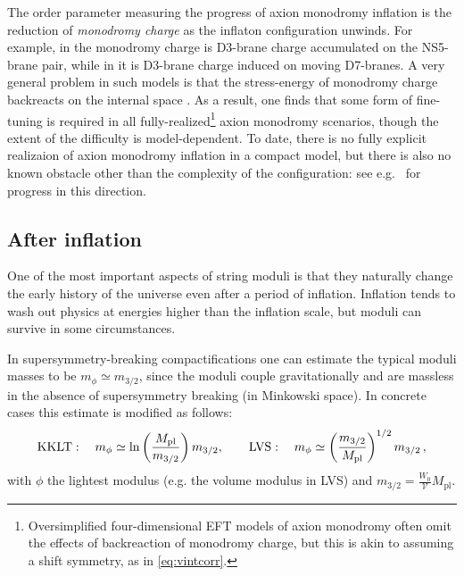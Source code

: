 \documentclass[12pt,a4wide]{article}
\def\V{\mathcal{V}}
\def\be{\begin{equation}}
\def\ee{\end{equation}}
\begin{document}
The order parameter measuring the progress of axion monodromy inflation is the reduction of \emph{monodromy charge} as the inflaton configuration unwinds.  For example, in \cite{McAllister:2008hb} the monodromy charge is D3-brane charge accumulated on the NS5-brane pair, while in \cite{Ibanez:2014swa} it is D3-brane charge induced on moving D7-branes.  A very general problem in such models is that the stress-energy of monodromy charge backreacts on the internal space
\cite{McAllister:2008hb,Flauger:2009ab,McAllister:2016vzi,Kim:2018vgz}.
As a result, one finds that some form of fine-tuning is required in all fully-realized\footnote{Oversimplified four-dimensional EFT models of axion monodromy often omit the effects of backreaction of monodromy charge, but this is akin to assuming a shift symmetry, as in \eqref{eq:vintcorr}.} axion monodromy scenarios, though the extent of the difficulty is model-dependent.  To date, there is no fully explicit realizaion of axion monodromy inflation in a compact model, but there is also no known obstacle other than the complexity of the configuration: see e.g.~\cite{Marchesano:2014mla,Hebecker:2014kva,Blumenhagen:2014gta,Hebecker:2014eua,Arends:2014qca,Blumenhagen:2014nba,McAllister:2014mpa,Hebecker:2015rya} for progress in this direction. 
  

 









\subsection{After inflation}


One of the most important aspects of string moduli is that they naturally change the early history of the universe even after a period of inflation. Inflation tends to wash out physics at energies higher than the inflation scale, but moduli can survive in some circumstances. 

In supersymmetry-breaking compactifications one can estimate the typical moduli masses to be $m_\phi \simeq  m_{3/2}$, since the moduli couple gravitationally and are massless in the absence of supersymmetry breaking (in Minkowski space).
In concrete cases this estimate is modified as follows:
\be
\hbox{KKLT}:\quad m_\phi\simeq \ln\left(\frac{M_{\text{pl}}}{m_{3/2}}\right)m_{3/2}, \qquad\hbox{LVS}:\quad m_\phi\simeq \left(\frac{m_{3/2}}{M_{\text{pl}}}\right)^{1/2} m_{3/2}\,,
\ee
with $\phi$ the lightest modulus (e.g. the volume modulus in LVS) and $m_{3/2}=\frac{W_0}{\V}M_{\text{pl}}$.
\end{document}
